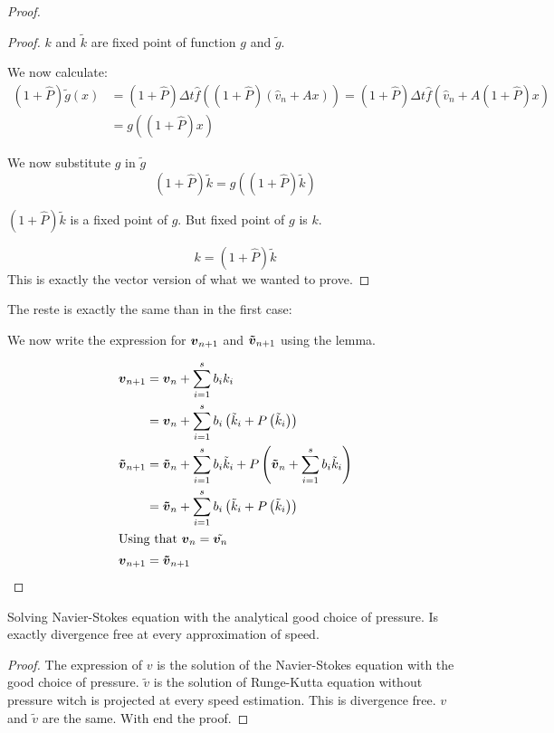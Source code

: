 \begin{proof}
\begin{proof}
$k$ and $\tilde{k}$ are fixed point of function $g$ and $\tilde{g}$.

We now calculate:
\begin{align}
 (1+\hat{P})\tilde{g}(x)&=(1+\hat{P})\Delta t \hat{f}((1+\hat{P})(\hat{v}_{n}+Ax))=(1+\hat{P})\Delta t \hat{f}(\hat{v}_{n}+A (1+\hat{P})x)\\
 &=g((1+\hat{P})x)
\end{align}

We now substitute $g$ in $\tilde{g}$
\begin{equation}
(1+\hat{P})\tilde{k}=g((1+\hat{P})\tilde{k})
\end{equation}

$(1+\hat{P})\tilde{k}$ is a fixed point of $g$.
But fixed point of $g$ is $k$.

\begin{equation}
 k=(1+\hat{P})\tilde{k}
\end{equation}
This is exactly the vector version of what we wanted to prove.
 \end{proof}
 
 The reste is exactly the same than in the first case:
 
 We now write the expression for ${\boldsymbol {v}}_{n+1}$ and ${\boldsymbol {\tilde{v}}}_{n+1}$ using the lemma.
 
 \begin{align*}
 {\boldsymbol {v}}_{n+1}&={\boldsymbol {v}}_{n}+\sum_{i=1}^{s}b_{i}k_{i}\\
 &={\boldsymbol {v}}_{n}+\sum_{i=1}^{s}b_{i}\left(\tilde{k}_{i}+P\left(\tilde{k}_{i}\right)\right)\\
 {\boldsymbol {\tilde{v}}}_{n+1}&={\boldsymbol {\tilde{v}}}_{n}+\sum_{i=1}^{s}b_{i}\tilde{k}_{i}+P\left({\boldsymbol {\tilde{v}}}_{n}+\sum_{i=1}^{s}b_{i}\tilde{k}_{i}\right)\\
 &={\boldsymbol {\tilde{v}}}_{n}+\sum_{i=1}^{s}b_{i}\left(\tilde{k}_{i}+P\left(\tilde{k}_{i}\right)\right)\\
 \intertext{Using that ${\boldsymbol {v}}_{n}=\tilde{{\boldsymbol {v}}_{n}}$}
 {\boldsymbol {v}}_{n+1}&={\boldsymbol {\tilde{v}}}_{n+1}
 \end{align*}

 \end{proof}
 
 \begin{cor}
Solving Navier-Stokes equation with the analytical good choice of pressure.
Is exactly divergence free at every approximation of speed.
 \end{cor}
 \begin{proof}
  The expression of $v$ is the solution of the Navier-Stokes equation with the good choice of pressure.
  $\tilde{v}$ is the solution of Runge-Kutta equation without pressure witch is projected at every speed estimation.
  This is divergence free.
  $v$ and $\tilde{v}$ are the same. With end the proof.
 \end{proof}
 
